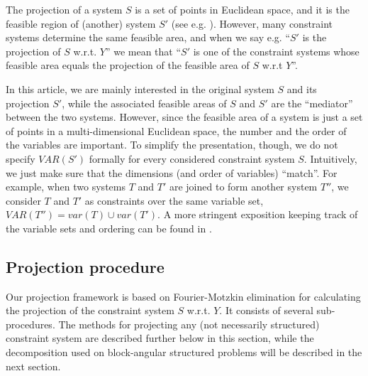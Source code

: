 \documentclass[citeauthoryear]{llncs}
\newcommand{\var}{\mathit{var}}
\newcommand{\VAR}{\mathit{VAR}}
\begin{document}
The projection of a system $S$ is a set of points in Euclidean space, and it is the feasible region of (another) system $S'$ (see e.g. \cite{ziegler95}). However, many constraint systems determine the same feasible area, and when we say e.g. ``$S'$ is the projection of $S$ w.r.t. $Y$'' we mean that ``$S'$ is one of the constraint systems whose feasible area equals the projection of the feasible area of $S$ w.r.t $Y$''.

In this article, we are mainly interested in the original system $S$ and its projection $S'$, while the associated feasible areas of $S$ and $S'$ are the ``mediator'' between the two systems. However, since the feasible area of a system is just a set of points in a multi-dimensional Euclidean space, the number and the order of the variables are important. To simplify the presentation, though, we do not specify $\VAR(S')$ formally for every considered constraint system $S$. Intuitively, we just make sure that the dimensions (and order of variables) ``match''. For example, when two systems $T$ and $T'$ are joined to form another system $T''$, we consider $T$ and $T'$ as constraints over the same variable set, $\VAR(T'')=\var(T)\cup \var(T')$. A more stringent exposition keeping track of the variable sets and ordering can be found in \cite{MyTechRep}.

\subsection{Projection procedure} \label{sec:methods}
Our projection framework is based on Fourier-Motzkin elimination for calculating the projection of the constraint system $S$ w.r.t. $Y$. It consists of several sub-procedures. The methods for projecting any (not necessarily structured) constraint system are described further below in this section, while the decomposition used on block-angular structured problems will be described in the next section.
\end{document}
